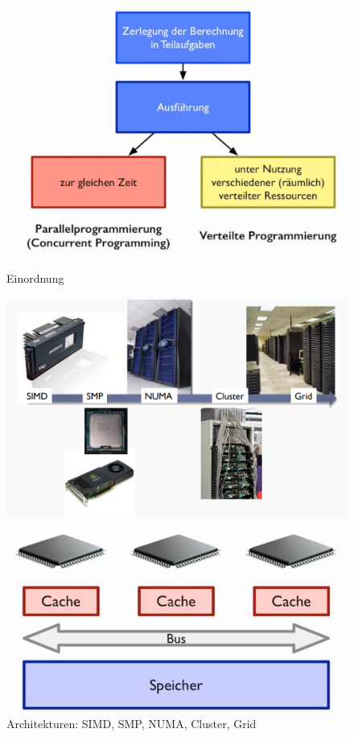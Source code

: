 \documentclass[10pt]{article}
\begin{document}
\begin{figure}[!tbp]
  \centering
  \begin{minipage}[b]{0.45\textwidth}
    \includegraphics[width=1.0\linewidth]{Assets/Programmierparadigmen-einordnung-programmierung}
    \caption{Einordnung}
  \end{minipage}
  \hfill
  \begin{minipage}[b]{0.45\textwidth}
    \includegraphics[width=1.0\linewidth]{Assets/Programmierparadigmen-Architekturen}
    \caption{Architekturen: SIMD, SMP, NUMA, Cluster, Grid}
  \end{minipage}
  \vfill
  \begin{minipage}[b]{0.45\textwidth}
    \includegraphics[width=1.0\linewidth]{Assets/Programmierparadigmen-Multiprozessorsysteme}

\end{minipage}
\end{figure}
\end{document}
